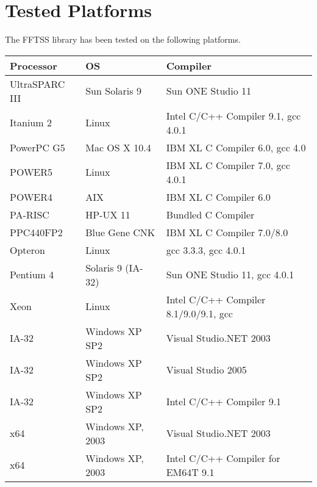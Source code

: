 \documentclass{article}
\begin{document}
\section{Tested Platforms}
The FFTSS library has been tested on the following platforms.\\
\vspace{1cm}
\begin{tabular}{|l|l|l|}
\hline
Processor&OS&Compiler\\
\hline
UltraSPARC III&Sun Solaris 9&Sun ONE Studio 11\\
\hline
Itanium 2&Linux&Intel C/C++ Compiler 9.1, gcc 4.0.1\\
\hline
PowerPC G5&Mac OS X 10.4&IBM XL C Compiler 6.0, gcc 4.0\\
\hline
POWER5&Linux&IBM XL C Compiler 7.0, gcc 4.0.1\\
\hline
POWER4&AIX&IBM XL C Compiler 6.0\\
\hline
PA-RISC&HP-UX 11&Bundled C Compiler\\
\hline
PPC440FP2&Blue Gene CNK&IBM XL C Compiler 7.0/8.0\\
\hline
Opteron&Linux&gcc 3.3.3, gcc 4.0.1\\
\hline
Pentium 4&Solaris 9 (IA-32)&Sun ONE Studio 11, gcc 4.0.1\\
\hline
Xeon&Linux&Intel C/C++ Compiler 8.1/9.0/9.1, gcc\\
\hline
IA-32&Windows XP SP2&Visual Studio.NET 2003\\
\hline
IA-32&Windows XP SP2&Visual Studio 2005\\
\hline
IA-32&Windows XP SP2&Intel C/C++ Compiler 9.1\\
\hline
x64&Windows XP, 2003&Visual Studio.NET 2003\\
\hline
x64&Windows XP, 2003&Intel C/C++ Compiler for EM64T 9.1\\
\hline
\end{tabular}
\end{document}
